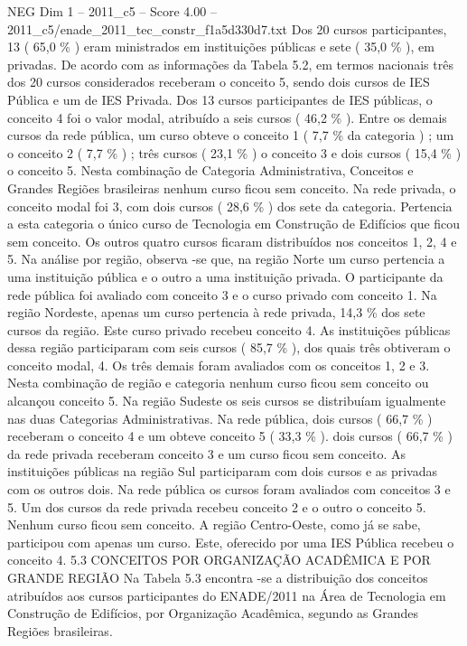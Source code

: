 \begin{textsample}{NEG Dim 1 – 2011\_c5 – Score 4.00 – 2011\_c5/enade\_2011\_tec\_constr\_f1a5d330d7.txt}
Dos 20 cursos participantes, 13 ( 65,0 \% ) eram ministrados em instituições públicas e sete ( 35,0 \% ), em privadas.
De acordo com as informações da Tabela 5.2, em termos nacionais três dos 20 cursos considerados receberam o conceito 5, sendo dois cursos de IES Pública e um de IES Privada.
Dos 13 cursos participantes de IES públicas, o conceito 4 foi o valor modal, atribuído a seis cursos ( 46,2 \% ).
Entre os demais cursos da rede pública, um curso obteve o conceito 1 ( 7,7 \% da categoria ) ; um o conceito 2 ( 7,7 \% ) ; três cursos ( 23,1 \% ) o conceito 3 e dois cursos ( 15,4 \% ) o conceito 5.
Nesta combinação de Categoria Administrativa, Conceitos e Grandes Regiões brasileiras nenhum curso ficou sem conceito.
Na rede privada, o conceito modal foi 3, com dois cursos ( 28,6 \% ) dos sete da categoria.
Pertencia a esta categoria o único curso de Tecnologia em Construção de Edifícios que ficou sem conceito.
Os outros quatro cursos ficaram distribuídos nos conceitos 1, 2, 4 e 5.
Na análise por região, observa -se que, na região Norte um curso pertencia a uma instituição pública e o outro a uma instituição privada.
O participante da rede pública foi avaliado com conceito 3 e o curso privado com conceito 1.
Na região Nordeste, apenas um curso pertencia à rede privada, 14,3 \% dos sete cursos da região.
Este curso privado recebeu conceito 4.
As instituições públicas dessa região participaram com seis cursos ( 85,7 \% ), dos quais três obtiveram o conceito modal, 4.
Os três demais foram avaliados com os conceitos 1, 2 e 3.
Nesta combinação de região e categoria nenhum curso ficou sem conceito ou alcançou conceito 5.
Na região Sudeste os seis cursos se distribuíam igualmente nas duas Categorias Administrativas.
Na rede pública, dois cursos ( 66,7 \% ) receberam o conceito 4 e um obteve conceito 5 ( 33,3 \% ). dois cursos ( 66,7 \% ) da rede privada receberam conceito 3 e um curso ficou sem conceito.
As instituições públicas na região Sul participaram com dois cursos e as privadas com os outros dois.
Na rede pública os cursos foram avaliados com conceitos 3 e 5.
Um dos cursos da rede privada recebeu conceito 2 e o outro o conceito 5.
Nenhum curso ficou sem conceito.
A região Centro-Oeste, como já se sabe, participou com apenas um curso.
Este, oferecido por uma IES Pública recebeu o conceito 4. 5.3 CONCEITOS POR ORGANIZAÇÃO ACADÊMICA E POR GRANDE REGIÃO Na Tabela 5.3 encontra -se a distribuição dos conceitos atribuídos aos cursos participantes do ENADE/2011 na Área de Tecnologia em Construção de Edifícios, por Organização Acadêmica, segundo as Grandes Regiões brasileiras.

\end{textsample}
